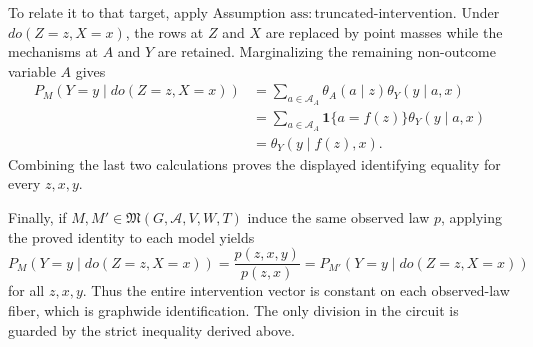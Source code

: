 To relate it to that target, apply Assumption \(\mathrm{ass:truncated\text{-}intervention}\).  Under \(do(Z=z,X=x)\), the rows at \(Z\) and \(X\) are replaced by point masses while the mechanisms at \(A\) and \(Y\) are retained.  Marginalizing the remaining non-outcome variable \(A\) gives
\[
\begin{aligned}
 P_M(Y=y\mid do(Z=z,X=x))
 &=\sum_{a\in\mathcal A_A}\theta_A(a\mid z)\theta_Y(y\mid a,x)\\
 &=\sum_{a\in\mathcal A_A}\mathbf 1\{a=f(z)\}\theta_Y(y\mid a,x)\\
 &=\theta_Y(y\mid f(z),x).
\end{aligned}
\]
Combining the last two calculations proves the displayed identifying equality for every \(z,x,y\).

Finally, if \(M,M'\in\mathfrak M(G,\mathcal A,V,W,T)\) induce the same observed law \(p\), applying the proved identity to each model yields
\[
 P_M(Y=y\mid do(Z=z,X=x))
 =\frac{p(z,x,y)}{p(z,x)}
 =P_{M'}(Y=y\mid do(Z=z,X=x))
\]
for all \(z,x,y\).  Thus the entire intervention vector is constant on each observed-law fiber, which is graphwide identification.  The only division in the circuit is guarded by the strict inequality derived above.